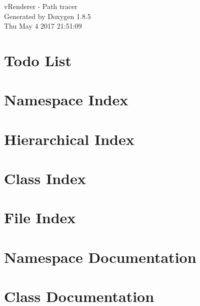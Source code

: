 \documentclass[twoside]{book}
\newcommand{\clearemptydoublepage}{%
  \newpage{\pagestyle{empty}\cleardoublepage}%
}
\begin{document}
\hypersetup{pageanchor=false}
\begin{titlepage}
\vspace*{7cm}
\begin{center}%
{\Large v\-Renderer -\/ Path tracer }\\
\vspace*{1cm}
{\large Generated by Doxygen 1.8.5}\\
\vspace*{0.5cm}
{\small Thu May 4 2017 21:51:09}\\
\end{center}
\end{titlepage}
\clearemptydoublepage
\tableofcontents
\clearemptydoublepage
{}
\hypersetup{pageanchor=true}

\chapter{Todo List}
\label{todo}
\hypertarget{todo}{}

\chapter{Namespace Index}

\chapter{Hierarchical Index}

\chapter{Class Index}

\chapter{File Index}

\chapter{Namespace Documentation}


\chapter{Class Documentation}


























\end{document}
